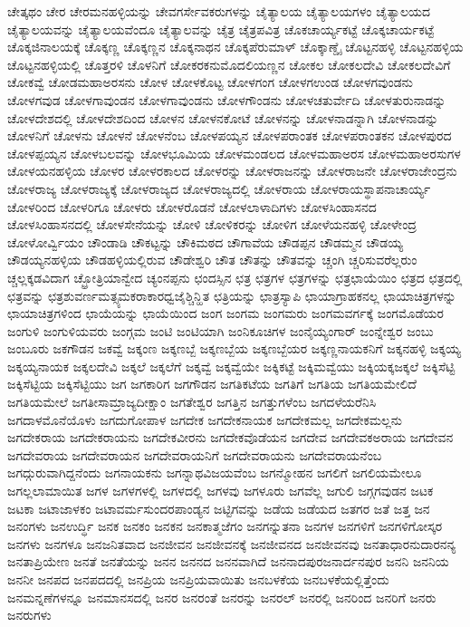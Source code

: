 {ಚೇತ್ಕಥಂ
ಚೇರ
ಚೇರಮನಹಳ್ಳಿಯನ್ನು
ಚೇವಗರ್ಸೇವಕರುಗಳನ್ನು
ಚೈತ್ಯಾಲಯ
ಚೈತ್ಯಾಲಯಗಳಂ
ಚೈತ್ಯಾಲಯದ
ಚೈತ್ಯಾಲಯವನ್ನು
ಚೈತ್ಯಾಲಯವೆಂದೂ
ಚೈತ್ಯಾಲವನ್ನು
ಚೈತ್ರ
ಚೈತ್ರಪವಿತ್ರ
ಚೊಕಚಾರ್ಯ್ಯಕಟ್ಟೆ
ಚೊಕ್ಕಚಾರ್ಯಕಟ್ಟೆ
ಚೊಕ್ಕಜಿನಾಲಯಕ್ಕೆ
ಚೊಕ್ಕಣ್ಣ
ಚೊಕ್ಕಣ್ಣನ
ಚೊಕ್ಕನಾಥನ
ಚೊಕ್ಕಪೆರುಮಾಳ್
ಚೊಕ್ಕಾಣ್ಡೈ
ಚೊಟ್ಟನಹಳ್ಳಿ
ಚೊಟ್ಟನಹಳ್ಳಿಯ
ಚೊಟ್ಟನಹಳ್ಳಿಯಲ್ಲಿ
ಚೊತ್ತರಳಿ
ಚೊಳನಿಗೆ
ಚೋಕರಕನುಮೊದಲಿಯಣ್ಣನ
ಚೋಕಲ
ಚೋಕಲದೇವಿ
ಚೋಕಲದೇವಿಗೆ
ಚೋಕವ್ವೆ
ಚೋಡಮಹಾಅರಸನು
ಚೋಳ
ಚೋಳಕೊಟ್ಟ
ಚೋಳಗಂಗ
ಚೋಳಗಉಂಡ
ಚೋಳಗವುಂಡನು
ಚೋಳಗವುಡ
ಚೋಳಗಾವುಂಡನ
ಚೋಳಗಾವುಂಡನು
ಚೋಳಗೌಂಡನು
ಚೋಳಚತುರ್ವೇದಿ
ಚೋಳತುರುನಾಡನ್ನು
ಚೋಳದೇಶದಲ್ಲಿ
ಚೋಳದೇಶದಿಂದ
ಚೋಳನ
ಚೋಳನಕೋಟೆ
ಚೋಳನನ್ನು
ಚೋಳನಾಡನ್ನಾಗಿ
ಚೋಳನಾಡನ್ನು
ಚೋಳನಿಗೆ
ಚೋಳನು
ಚೋಳನೆ
ಚೋಳನೆಂಬ
ಚೋಳಪಯ್ಯನ
ಚೋಳಪರಾಂತಕ
ಚೋಳಪರಾಂತಕನ
ಚೋಳಪುರದ
ಚೋಳಪ್ಪಯ್ಯನ
ಚೋಳಬಲವನ್ನು
ಚೋಳಭೂಮಿಯ
ಚೋಳಮಂಡಲದ
ಚೋಳಮಹಾಅರಸ
ಚೋಳಮಹಾಅರಸುಗಳ
ಚೋಳಯನಹಳ್ಳಿಯ
ಚೋಳರ
ಚೋಳರಕಾಲದ
ಚೋಳರನ್ನು
ಚೋಳರಾಜನನ್ನು
ಚೋಳರಾಜನೇ
ಚೋಳರಾಜೇಂದ್ರನು
ಚೋಳರಾಜ್ಯ
ಚೋಳರಾಜ್ಯಕ್ಕೆ
ಚೋಳರಾಜ್ಯದ
ಚೋಳರಾಜ್ಯದಲ್ಲಿ
ಚೋಳರಾಯ
ಚೋಳರಾಯಸ್ಥಾಪನಾಚಾರ್ಯ್ಯ
ಚೋಳರಿಂದ
ಚೋಳರಿಗೂ
ಚೋಳರು
ಚೋಳರೊಡನೆ
ಚೋಳಲಾಳಾದಿಗಳು
ಚೋಳಸಿಂಹಾಸನದ
ಚೋಳಸಿಂಹಾಸನದಲ್ಲಿ
ಚೋಳಸೇನೆಯನ್ನು
ಚೋಳಿ
ಚೋಳಿಕರನ್ನು
ಚೋಳಿಗ
ಚೋಳೆಯನಹಳ್ಳಿ
ಚೋಳೇಂದ್ರ
ಚೋಳೋರ್ವ್ವಿಯಂ
ಚೌಂಡಾಡಿ
ಚೌಕಟ್ಟನ್ನು
ಚೌಕಿಮಠದ
ಚೌಗಾವೆಯ
ಚೌಡಪ್ಪನ
ಚೌಡಮ್ಮನ
ಚೌಡಯ್ಯ
ಚೌಡಯ್ಯನಹಳ್ಳಿಯ
ಚೌಡಹಳ್ಳಿಯಲ್ಲಿರುವ
ಚೌಡೇಶ್ವರಿ
ಚೌತ
ಚೌತನ್ನು
ಚೌತವನ್ನು
ಚ್ಚಂಗಿ
ಚ್ಚರಿಸುವರೆಲ್ಲರುಂ
ಚ್ಚಲ್ಲಕ್ಕಡವಿದಾಗ
ಚ್ಛ್ರೋತ್ರಿಯಾನ್ವೇದ
ಚ್ಯಂನಪ್ಪನು
ಛಂದಸ್ಸಿನ
ಛತ್ರ
ಛತ್ರಗಳ
ಛತ್ರಗಳನ್ನು
ಛತ್ರಛಾಯೆಯಿಂ
ಛತ್ರದ
ಛತ್ರದಲ್ಲಿ
ಛತ್ರವನ್ನು
ಛತ್ರಶುವರ್ಣಮತ್ಸ್ಯಮಕರಾಕಾರಧ್ವಜೈಶ್ಚಿನ್ಹಿತ
ಛತ್ರಿಯನ್ನು
ಛಾತ್ರಸ್ಯಾಪಿ
ಛಾಯಾಗ್ರಾಹಕನಲ್ಲ
ಛಾಯಾಚಿತ್ರಗಳನ್ನು
ಛಾಯಾಚಿತ್ರಗಳಿಂದ
ಛಾಯೆಯನ್ನು
ಛಾಯೆಯಿಂದ
ಜಂಗ
ಜಂಗಮ
ಜಂಗಮರು
ಜಂಗಮವರ್ಗಕ್ಕೆ
ಜಂಗಮೊಡೆಯರ
ಜಂಗುಳಿ
ಜಂಗುಳಿಯವರು
ಜಂಗ್ಗಮ
ಜಂಟಿ
ಜಂಟಿಯಾಗಿ
ಜಂನಿಕೂಚಿಗಳ
ಜಂನೈಯ್ಯಂಗಾರ್
ಜಂನ್ನೇಶ್ವರ
ಜಂಬು
ಜಂಬೂರು
ಜಕಗೌಡನ
ಜಕವ್ವೆ
ಜಕ್ಕಂಣ
ಜಕ್ಕಣಬ್ಬೆ
ಜಕ್ಕಣಬ್ಬೆಯ
ಜಕ್ಕಣಬ್ಬೆಯರ
ಜಕ್ಕಣ್ಣನಾಯಕನಿಗೆ
ಜಕ್ಕನಹಳ್ಳಿ
ಜಕ್ಕಯ್ಯ
ಜಕ್ಕಯ್ಯನಾಯಕ
ಜಕ್ಕಲದೇವಿ
ಜಕ್ಕಲೆ
ಜಕ್ಕಲೆಗೆ
ಜಕ್ಕವ್ವೆ
ಜಕ್ಕವ್ವೆಯೇ
ಜಕ್ಕಿಕಟ್ಟೆ
ಜಕ್ಕಿಮವ್ವೆಯು
ಜಕ್ಕಿಯಕ್ಕಜಕ್ಕಲೆ
ಜಕ್ಕಿಸೆಟ್ಟಿ
ಜಕ್ಕಿಸೆಟ್ಟಿಯ
ಜಕ್ಕಿಸೆಟ್ಟಿಯು
ಜಗ
ಜಗಕಾರಿಗ
ಜಗಗೌಡನ
ಜಗತಿಕಟೆಯ
ಜಗತಿಗೆ
ಜಗತಿಯ
ಜಗತಿಯಮೇಲಿದೆ
ಜಗತಿಯಮೇಲೆ
ಜಗತೀಸಾಮ್ರಾಜ್ಯದೀಕ್ಷಾಂ
ಜಗತೇಶ್ವರ
ಜಗತ್ತಿನ
ಜಗತ್ತುಗಳೆಂಬ
ಜಗದಳೆಯರೆನಿಸಿ
ಜಗದಾಳಮೊನೆಯೊಳು
ಜಗದುಗೋಪಾಳ
ಜಗದೇಕ
ಜಗದೇಕನಾಯಕ
ಜಗದೇಕಮಲ್ಲ
ಜಗದೇಕಮಲ್ಲನು
ಜಗದೇಕರಾಯ
ಜಗದೇಕರಾಯನು
ಜಗದೇಕವೀರನು
ಜಗದೇಕವೊಡೆಯನ
ಜಗದೇವ
ಜಗದೇವಕಅರಾಯ
ಜಗದೇವನ
ಜಗದೇವರಾಯ
ಜಗದೇವರಾಯನ
ಜಗದೇವರಾಯನಿಗೆ
ಜಗದೇವರಾಯನು
ಜಗದೇವರಾಯನೆಂಬ
ಜಗದ್ಗುರುವಾಗಿದ್ದನೆಂದು
ಜಗನಾಯಕನು
ಜಗನ್ನಾಥವಿಜಯವೆಂಬ
ಜಗನ್ಮೋಹನ
ಜಗಲಿಗೆ
ಜಗಲಿಯಮೇಲೂ
ಜಗಲ್ಲಲಾಮಾಯಿತ
ಜಗಳ
ಜಗಳಗಳಲ್ಲಿ
ಜಗಳದಲ್ಲಿ
ಜಗಳವು
ಜಗಳೂರು
ಜಗವೆಲ್ಲ
ಜಗುಲಿ
ಜಗ್ಗಗವುಡನ
ಜಟಕ
ಜಟಕಾ
ಜಟಾಜಾಳಕಂ
ಜಟಾವರ್ಮಸುಂದರಪಾಂಡ್ಯನ
ಜಟ್ಟಿಗವನ್ನು
ಜಡೆಯ
ಜಡೆಯದ
ಜತಗರ
ಜತೆ
ಜತ್ತ
ಜನ
ಜನಂಗಳು
ಜನಉರ್ದ್ಧಿ
ಜನಕ
ಜನಕಂ
ಜನಕನ
ಜನಕಾತ್ಮಜೆಗಂ
ಜನಗನ್ನುತನಾ
ಜನಗಳ
ಜನಗಳಿಗೆ
ಜನಗಳಿಗೋಸ್ಕರ
ಜನಗಳು
ಜನಗಳೂ
ಜನಜನಿತವಾದ
ಜನಜೀವನ
ಜನಜೀವನಕ್ಕೆ
ಜನಜೀವನದ
ಜನಜೀವನವು
ಜನತಾಧಾರನುದಾರನನ್ಯ
ಜನತಾಪ್ರಿಯೇಣ
ಜನತೆ
ಜನತೆಯನ್ನು
ಜನನ
ಜನನದ
ಜನನವಾಗಿದೆ
ಜನನಾದಪುರಜನಾರ್ದನಪುರ
ಜನನಿ
ಜನನಿಯ
ಜನನೀ
ಜನಪದ
ಜನಪದದಲ್ಲಿ
ಜನಪ್ರಿಯ
ಜನಪ್ರಿಯವಾಯಿತು
ಜನಬಳಕೆಯ
ಜನಬಳಕೆಯಲ್ಲಿತ್ತೆಂದು
ಜನಮನ್ನಣೆಗಳನ್ನೂ
ಜನಮಾನಸದಲ್ಲಿ
ಜನರ
ಜನರಂತೆ
ಜನರನ್ನು
ಜನರಲ್
ಜನರಲ್ಲಿ
ಜನರಿಂದ
ಜನರಿಗೆ
ಜನರು
ಜನರುಗಳು
}

